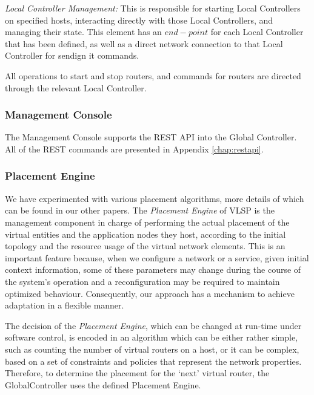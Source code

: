 \begin{description}[leftmargin=1.5em,labelindent=0,itemsep=3pt]
\item \textit{Local Controller Management:}  This is responsible for
  starting Local Controllers on specified hosts, interacting directly
  with those Local Controllers, and managing their state.  This
  element has an $end-point$ for each Local Controller that has been
  defined, as well as a direct network connection to that Local
  Controller for sendign it commands.

  All operations to start and stop routers, and commands for routers
  are directed through the relevant Local Controller.

  
\end{description}


\subsubsection{Management Console}

The Management Console supports the REST API into the Global
Controller.
All of the REST commands are presented in Appendix \ref{chap:restapi}.

\subsubsection{Placement Engine}

We have experimented with various placement algorithms, more details
of which can be found in our other papers. The \emph{Placement
Engine} of VLSP is the management component in charge of performing the
actual placement of the virtual entities and the application nodes
they host, according to the initial topology and the resource usage of
the virtual network elements. This is an important feature because,
when we configure a network or a service, given initial context
information, some of these parameters may change during the course of
the system’s operation and a reconfiguration may be required to
maintain optimized behaviour. Consequently, our approach has a
mechanism to achieve adaptation in a flexible manner.

The decision of the \emph{Placement Engine}, which can be changed at
run-time under software control, is encoded in an algorithm which can
be either rather simple, such as counting the number of virtual
routers on a host, or it can be complex, based on a set of constraints
and policies that represent the network properties. Therefore, to
determine the placement for the ‘next’ virtual router, the
GlobalController uses the defined Placement Engine.

